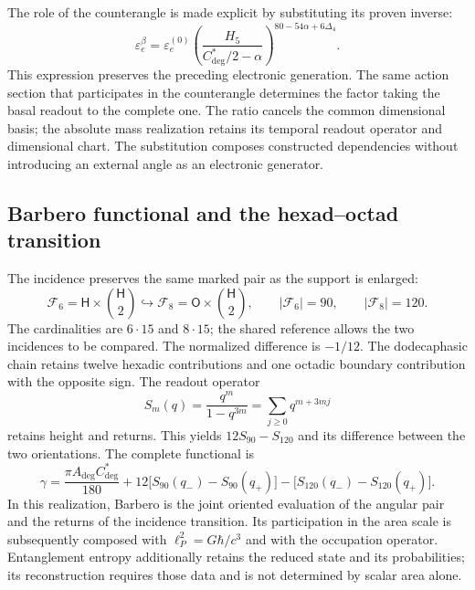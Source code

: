 The role of the counterangle is made explicit by substituting its proven
inverse:
\begin{equation}
 \boxed{\varepsilon_e^\beta=\varepsilon_e^{(0)}
 \left(\frac{H_5}{C^*_{\deg}/2-\alpha}\right)^{80-54\alpha+6\Delta_4}.}
 \label{md:compos:electron-contraangulo}
\end{equation}
This expression preserves the preceding electronic generation. The same
action section that participates in the counterangle determines the factor
taking the basal readout to the complete one. The ratio cancels the common
dimensional basis; the absolute mass realization retains its temporal
readout operator and dimensional chart. The substitution composes constructed
dependencies without introducing an external angle as an electronic generator.

\subsection{Barbero functional and the hexad--octad transition}
\label{md:compos:barbero}

The incidence preserves the same marked pair as the support is enlarged:
\begin{equation}
 \mathcal F_6=\mathsf H\times\binom{\mathsf H}{2}
 \hookrightarrow
 \mathcal F_8=\mathsf O\times\binom{\mathsf H}{2},
 \qquad |\mathcal F_6|=90,\qquad |\mathcal F_8|=120.
 \label{md:compos:incidencia}
\end{equation}
The cardinalities are $6\cdot15$ and $8\cdot15$; the shared reference allows
the two incidences to be compared. The normalized difference is $-1/12$.
The dodecaphasic chain retains twelve hexadic contributions and one octadic
boundary contribution with the opposite sign. The readout operator
\begin{equation}
 S_m(q)=\frac{q^m}{1-q^{3m}}
 =\sum_{j\geq0}q^{m+3mj}
 \label{md:compos:serie-retorno}
\end{equation}
retains height and returns. This yields $12S_{90}-S_{120}$ and its
difference between the two orientations. The complete functional is
\begin{equation}
 \gamma=\frac{\pi A_{\deg}C^*_{\deg}}{180}
 +12\bigl[S_{90}(q_-)-S_{90}(q_+)\bigr]
 -\bigl[S_{120}(q_-)-S_{120}(q_+)\bigr].
 \label{md:compos:funcional-barbero}
\end{equation}
In this realization, Barbero is the joint oriented evaluation of the
angular pair and the returns of the incidence transition. Its participation
in the area scale is subsequently composed with $\ell_P^2=G\hbar/c^3$ and
with the occupation operator. Entanglement entropy additionally retains the
reduced state and its probabilities; its reconstruction requires those data
and is not determined by scalar area alone.

